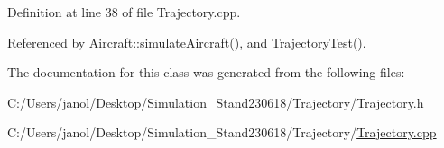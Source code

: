 Definition at line 38 of file Trajectory.\+cpp.



Referenced by Aircraft\+::simulate\+Aircraft(), and Trajectory\+Test().



The documentation for this class was generated from the following files\+:\begin{DoxyCompactItemize}
\item 
C\+:/\+Users/janol/\+Desktop/\+Simulation\+\_\+\+Stand230618/\+Trajectory/\hyperlink{_trajectory_8h}{Trajectory.\+h}\item 
C\+:/\+Users/janol/\+Desktop/\+Simulation\+\_\+\+Stand230618/\+Trajectory/\hyperlink{_trajectory_8cpp}{Trajectory.\+cpp}\end{DoxyCompactItemize}
